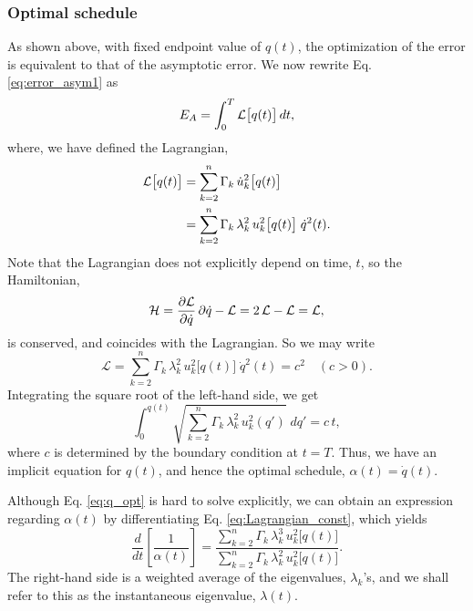 \documentclass[reprint, floatfix]{revtex4-1}
\newcommand{\Err}{E}
\begin{document}
\subsubsection{\label{sec:optschedule}
Optimal schedule}


As shown above, with fixed endpoint value of $q(t)$,
the optimization of the error is equivalent to
that of the asymptotic error.
%
We now rewrite Eq. \eqref{eq:error_asym1} as
%
\begin{equation}
  \Err_A
  =
  \int_0^T
    {\mathcal L} \bigl[ q(t)\bigr]
    \, dt,
  \notag
\end{equation}
%
where, we have defined the Lagrangian,
%
\begin{align}
  {\mathcal L} \bigl[ q(t) \bigr]
  &=
  \sum_{ k = 2 }^n
    \Gamma_k \, \dot u_k^2\bigl[ q(t) \bigr]
  \notag
  \\
  &=
  \sum_{ k = 2 }^n
    \Gamma_k \, \lambda_k^2 \, u_k^2 \bigl[ q(t) \bigr]
  \; \dot q^2( t ).
  \label{eq:error_asym_lagr}
\end{align}
%
Note that the Lagrangian
does not explicitly depend on time, $t$,
so the Hamiltonian,
%
\begin{equation}
  \mathcal H
  =
  \frac{ \partial \mathcal L }
       { \partial \dot q     }
  \, \partial \dot q
  -
  \mathcal L
  =
  2 \, \mathcal L
  - \mathcal L
  =
  \mathcal L,
  \notag
\end{equation}
%
is conserved,
and coincides with the Lagrangian.
%
So we may write
%
\begin{equation}
  \mathcal L
  =
    \textstyle\sum_{ k = 2 }^n
      \Gamma_k \, \lambda_k^2
      \, u_k^2 \bigl[ q(t) \bigr]
  \;
  \dot q^2(t)
  =
  c^2
  \quad
  (c > 0).
  \label{eq:Lagrangian_const}
\end{equation}
%
Integrating the square root of the left-hand side, we get
%
\begin{equation}
  \int_{ 0 }^{ q(t) }
    \sqrt{
      \textstyle\sum_{ k = 2 }^n
        \Gamma_k \, \lambda_k^2
        \, u_k^2( q' )
    }
    \;
    d q'
  =
  c \, t
  ,
  \label{eq:q_opt}
\end{equation}
%
where $c$ is determined by
the boundary condition at $t = T$.
%
Thus, we have an implicit equation for $q(t)$,
and hence the optimal schedule,
$\alpha(t) = \dot q(t)$.

Although Eq. \eqref{eq:q_opt} is hard to solve explicitly,
we can obtain an expression regarding $\alpha(t)$
by differentiating Eq. \eqref{eq:Lagrangian_const},
which yields
%
\begin{equation}
  \frac{ d   }
       { d t }
  \left[
    \frac{       1     }
         { \alpha( t ) }
  \right]
  =
  \frac{
    \sum_{ k = 2 }^n
      \Gamma_k \, \lambda_k^3
      \, u_k^2 \bigl[ q(t) \bigr]
  }
  {
    \sum_{ k = 2 }^n
      \Gamma_k \, \lambda_k^2
      \, u_k^2 \bigl[ q(t) \bigr]
  }
  .
  \label{eq:dinvadt}
\end{equation}
%
The right-hand side is a weighted average
of the eigenvalues, $\lambda_k$'s,
and we shall refer to this as the instantaneous
eigenvalue, $\lambda(t)$.
\end{document}
